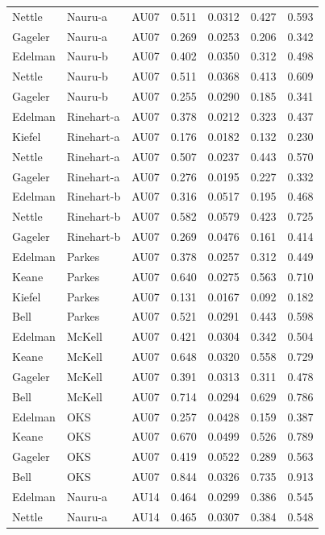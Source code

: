 \documentclass{monashthesis}
\begin{document}
\begin{center}
\begin{longtable}{lllllll}
Nettle & Nauru-a & AU07 & 0.511 & 0.0312 & 0.427 & 0.593 \\
Gageler & Nauru-a & AU07 & 0.269 & 0.0253 & 0.206 & 0.342 \\
Edelman & Nauru-b & AU07 & 0.402 & 0.0350 & 0.312 & 0.498 \\
Nettle & Nauru-b & AU07 & 0.511 & 0.0368 & 0.413 & 0.609 \\
Gageler & Nauru-b & AU07 & 0.255 & 0.0290 & 0.185 & 0.341 \\
Edelman & Rinehart-a & AU07 & 0.378 & 0.0212 & 0.323 & 0.437 \\
Kiefel & Rinehart-a & AU07 & 0.176 & 0.0182 & 0.132 & 0.230 \\
Nettle & Rinehart-a & AU07 & 0.507 & 0.0237 & 0.443 & 0.570 \\
Gageler & Rinehart-a & AU07 & 0.276 & 0.0195 & 0.227 & 0.332 \\
Edelman & Rinehart-b & AU07 & 0.316 & 0.0517 & 0.195 & 0.468 \\
Nettle & Rinehart-b & AU07 & 0.582 & 0.0579 & 0.423 & 0.725 \\
Gageler & Rinehart-b & AU07 & 0.269 & 0.0476 & 0.161 & 0.414 \\
Edelman & Parkes & AU07 & 0.378 & 0.0257 & 0.312 & 0.449 \\
Keane & Parkes & AU07 & 0.640 & 0.0275 & 0.563 & 0.710 \\
Kiefel & Parkes & AU07 & 0.131 & 0.0167 & 0.092 & 0.182 \\
Bell & Parkes & AU07 & 0.521 & 0.0291 & 0.443 & 0.598 \\
Edelman & McKell & AU07 & 0.421 & 0.0304 & 0.342 & 0.504 \\
Keane & McKell & AU07 & 0.648 & 0.0320 & 0.558 & 0.729 \\
Gageler & McKell & AU07 & 0.391 & 0.0313 & 0.311 & 0.478 \\
Bell & McKell & AU07 & 0.714 & 0.0294 & 0.629 & 0.786 \\
Edelman & OKS & AU07 & 0.257 & 0.0428 & 0.159 & 0.387 \\
Keane & OKS & AU07 & 0.670 & 0.0499 & 0.526 & 0.789 \\
Gageler & OKS & AU07 & 0.419 & 0.0522 & 0.289 & 0.563 \\
Bell & OKS & AU07 & 0.844 & 0.0326 & 0.735 & 0.913 \\
Edelman & Nauru-a & AU14 & 0.464 & 0.0299 & 0.386 & 0.545 \\
Nettle & Nauru-a & AU14 & 0.465 & 0.0307 & 0.384 & 0.548 \\

\end{longtable}
\end{center}
\end{document}

